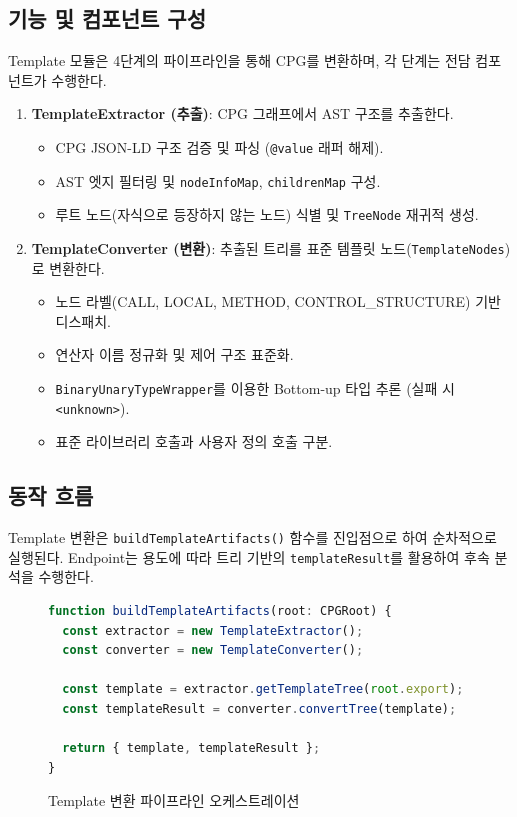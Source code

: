 \subsection{기능 및 컴포넌트 구성}
Template 모듈은 4단계의 파이프라인을 통해 CPG를 변환하며, 각 단계는 전담 컴포넌트가 수행한다.

\begin{enumerate}
    \item \textbf{TemplateExtractor (추출)}: CPG 그래프에서 AST 구조를 추출한다.
    \begin{itemize}
        \item CPG JSON-LD 구조 검증 및 파싱 (\texttt{@value} 래퍼 해제).
        \item AST 엣지 필터링 및 \texttt{nodeInfoMap}, \texttt{childrenMap} 구성.
        \item 루트 노드(자식으로 등장하지 않는 노드) 식별 및 \texttt{TreeNode} 재귀적 생성.
    \end{itemize}
    
    \item \textbf{TemplateConverter (변환)}: 추출된 트리를 표준 템플릿 노드(\texttt{TemplateNodes})로 변환한다.
    \begin{itemize}
        \item 노드 라벨(CALL, LOCAL, METHOD, CONTROL\_STRUCTURE) 기반 디스패치.
        \item 연산자 이름 정규화 및 제어 구조 표준화.
        \item \texttt{BinaryUnaryTypeWrapper}를 이용한 Bottom-up 타입 추론 (실패 시 \texttt{<unknown>}).
        \item 표준 라이브러리 호출과 사용자 정의 호출 구분.
    \end{itemize}
\end{enumerate}

\subsection{동작 흐름}
Template 변환은 \texttt{buildTemplateArtifacts()} 함수를 진입점으로 하여 순차적으로 실행된다. Endpoint는 용도에 따라 트리 기반의 \texttt{templateResult}를 활용하여 후속 분석을 수행한다.

\begin{figure}[H]
    \centering
    \begin{lstlisting}[language=TypeScript]
function buildTemplateArtifacts(root: CPGRoot) {
  const extractor = new TemplateExtractor();
  const converter = new TemplateConverter();

  const template = extractor.getTemplateTree(root.export);
  const templateResult = converter.convertTree(template);

  return { template, templateResult };
}
    \end{lstlisting}
    \caption{Template 변환 파이프라인 오케스트레이션}
    \label{fig:build_artifacts}
\end{figure}

